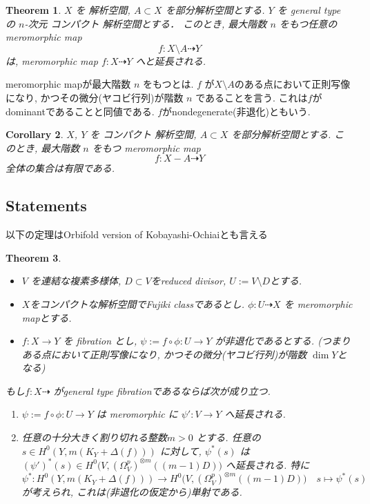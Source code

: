 \documentclass[dvipdfmx,a4paper,11pt]{article} %
\newtheorem{thm}{Theorem}[section]
\newtheorem{cor}[thm]{Corollary}
\theoremstyle{definition}
\theoremstyle{remark}
\numberwithin{equation}{section}
\begin{document}
\begin{thm}\label{thm:2}
\(X\) を 解析空間, \(A \subset X\) を部分解析空間とする. 
\(Y\) を general type の \(n\)-次元 コンパクト 解析空間とする．
このとき, 最大階数 \(n\) をもつ任意の meromorphic map
\[
f\colon X \setminus A \dashrightarrow Y
\]
は, meromorphic map \(f\colon X\dashrightarrow Y\) へと延長される.
\end{thm}

 meromorphic mapが最大階数 \(n\) をもつとは.
  \(f\) が$X \setminus A$のある点において正則写像になり, かつその微分(ヤコビ行列)が階数 \(n\) であることを言う. 
これは$f$がdominantであることと同値である. 
$f$がnondegenerate(非退化)ともいう.


\begin{cor}
\(X\), \(Y\) を コンパクト 解析空間, \(A \subset X\) を部分解析空間とする. 
このとき, 最大階数 \(n\) をもつ meromorphic map
\[
f\colon X-A \dashrightarrow Y
\]
全体の集合は有限である.
\end{cor}

\subsection{Statements \cite[8.1]{Cam04}}
以下の定理はOrbifold version of Kobayashi-Ochiaiとも言える

\begin{thm}\cite[Theorem 8.2]{Cam04}
\label{thm-Cam04-8.2}
\begin{itemize}
\item \(V\) を連結な複素多様体, $D \subset V$をreduced divisor, $U:= V \setminus D$とする.
\item $X$をコンパクトな解析空間でFujiki classであるとし. \(\phi:U \dashrightarrow  X\) を meromorphic mapとする. 
\item \(f:X\to Y\) を fibration とし, \(\psi:=f\circ\phi : U\to Y\) が非退化であるとする. (つまりある点において正則写像になり, かつその微分(ヤコビ行列)が階数 \(\dim Y\)となる)
\end{itemize}

もし\(f : X \dashrightarrow \) がgeneral type fibrationであるならば次が成り立つ. 
\begin{enumerate}
\item \(\psi:=f\circ\phi : U\to Y\) は meromorphic に \(\psi' : V\to Y\) へ延長される.
\item 任意の十分大きく割り切れる整数\(m>0\) とする. 
任意の \(s\in H^0(Y,m(K_Y+\Delta(f)))\) に対して, \(\psi^*(s)\) は \((\psi')^*(s)\in H^0\bigl(V,(\Omega_V^p)^{\otimes m}((m-1)D)\bigr)\) へ延長される. 
特に
$$
\psi^{* }: H^0(Y,m(K_Y+\Delta(f))) \to  H^0\bigl(V,(\Omega_V^p)^{\otimes m}((m-1)D)\bigr)
\quad s \mapsto \psi^*(s)
$$
が考えられ, これは(非退化の仮定から)単射である. 
\end{enumerate}
\end{thm}
\end{document}
